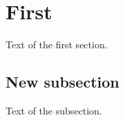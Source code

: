 \documentclass{article}
\begin{document}
\section{First}
\startcontents
{}
Text of the first section.
\subsection{New subsection}
Text of the subsection.
\end{document}
